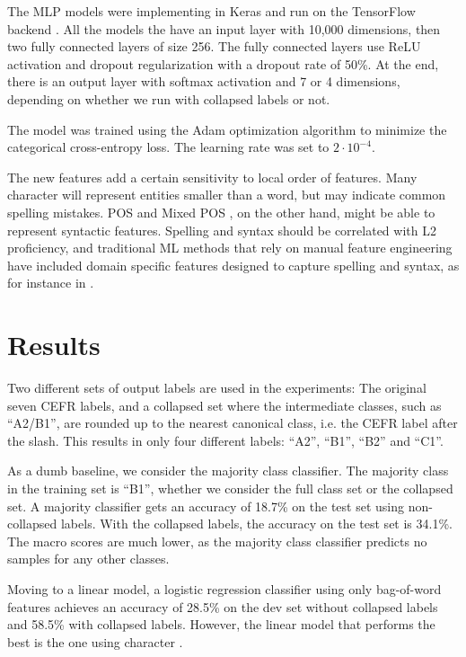 The MLP models were implementing in Keras \autocite{keras} and run on the
TensorFlow backend \autocite{tensorflow}. All the models the have an input
layer with 10,000 dimensions, then two fully connected layers of size 256.
The fully connected layers use \ac{ReLU} activation and dropout
regularization with a dropout rate of 50\%. At the end, there is an output
layer with softmax activation and 7 or 4 dimensions, depending on whether we
run with collapsed labels or not.

The model was trained using the Adam optimization algorithm
\autocite{kingma2014adam} to minimize the categorical cross-entropy loss. The
learning rate was set to $2\cdot 10^{-4}$.

The new \ngram features add a certain sensitivity to local order of features.
Many character \ngrams will represent entities smaller than a word, but may
indicate common spelling mistakes. \ac{POS} and Mixed POS \ngrams, on the
other hand, might be able to represent syntactic features. Spelling and
syntax should be correlated with L2 proficiency, and traditional \ac{ML}
methods that rely on manual feature engineering have included domain specific
features designed to capture spelling and syntax, as for instance in
\textcite{vajjala17}.


\section{Results}

Two different sets of output labels are used in the experiments: The original
seven CEFR labels, and a collapsed set where the intermediate classes, such
as ``A2/B1'', are rounded up to the nearest canonical class, i.e. the CEFR
label after the slash. This results in only four different labels: ``A2'',
``B1'', ``B2'' and ``C1''.

As a dumb baseline, we consider the majority class classifier. The majority
class in the training set is ``B1'', whether we consider the full class set
or the collapsed set. A majority classifier gets an accuracy of 18.7\% on the
test set using non-collapsed labels. With the collapsed labels, the accuracy
on the test set is 34.1\%. The macro \FI scores are much lower, as the
majority class classifier predicts no samples for any other classes.

Moving to a linear model, a logistic regression classifier using only
bag-of-word features achieves an accuracy of 28.5\% on the dev set without
collapsed labels and 58.5\% with collapsed labels. However, the linear model
that performs the best is the one using character \ngrams.

